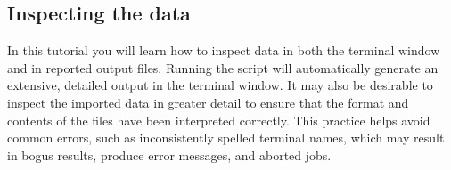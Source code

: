 \documentclass[11pt]{article}
\begin{document}
\subsection{Inspecting the data}
\label{subsec:Inspecting}

In this tutorial you will learn how to inspect data in both the terminal window and 
in reported output files. Running the script will automatically generate an extensive, 
detailed output in the terminal window. It may also be desirable to inspect the 
imported data in greater detail to ensure that the format and contents of the files 
have been interpreted correctly. This practice helps avoid common errors, such 
as inconsistently spelled terminal names, which may result in bogus results, 
produce error messages, and aborted jobs.
\end{document}
